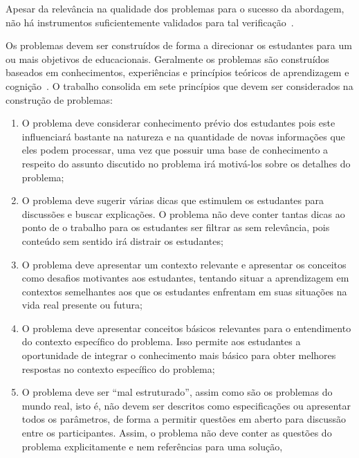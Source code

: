 Apesar da relevância na qualidade dos problemas para o
sucesso da abordagem, não há instrumentos suficientemente
validados para tal
verificação~\cite{des1999delphi,sockalingam2012assessing}.

Os problemas devem ser construídos de forma a
direcionar os estudantes
para um ou mais objetivos de educacionais.
Geralmente os problemas são construídos baseados em conhecimentos,
experiências e princípios teóricos de aprendizagem e
cognição~\cite{des1999delphi,dolmans1997seven}.
O trabalho \cite{dolmans1997seven} consolida em sete
princípios que devem ser considerados na construção
de problemas:

\begin{enumerate}
\item{O problema deve considerar conhecimento
prévio dos estudantes pois este influenciará bastante na
natureza e na quantidade de novas informações que
eles podem processar, uma vez que possuir
uma base de conhecimento a respeito do assunto
discutido no problema irá motivá-los sobre os
detalhes do problema;}
\item{O problema deve sugerir várias dicas
que estimulem os estudantes para discussões
e buscar explicações. O problema não deve
conter tantas dicas ao ponto de o trabalho
para os estudantes ser filtrar as sem relevância,
pois conteúdo sem sentido irá distrair
os estudantes;}
\item{O problema deve apresentar um contexto relevante e
apresentar os conceitos como desafios motivantes aos
estudantes, tentando situar a aprendizagem em contextos
semelhantes aos que os estudantes enfrentam em suas
situações na vida real presente ou futura;}
\item{O problema deve apresentar conceitos básicos
relevantes para o entendimento do contexto específico
do problema.
Isso permite aos estudantes a oportunidade
de integrar o conhecimento mais básico para obter melhores
respostas no contexto específico do problema;}
\item{O problema deve ser ``mal estruturado'', assim como
são os problemas do mundo real, isto é, não
devem ser descritos como especificações ou apresentar
todos os parâmetros, de forma a permitir questões em
aberto para discussão entre os participantes.
Assim, o problema não deve conter as questões do problema
explicitamente e nem referências para uma solução,
}
\end{enumerate}
